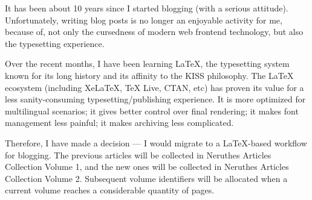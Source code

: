 
It has been about 10 years since I started blogging (with a serious attitude).
Unfortunately, writing blog posts is no longer an enjoyable activity for me,
because of, not only the cursedness of modern web frontend technology,
but also the typesetting experience.

Over the recent months, I have been learning \LaTeX{},
the typesetting system known for its long history and its affinity to the KISS philosophy.
The \LaTeX{} ecosystem (including XeLaTeX, \TeX{} Live, CTAN, etc)
has proven its value for a less sanity-consuming typesetting/publishing experience.
It is more optimized for multilingual scenarios; it gives better control over final rendering;
it makes font management less painful; it makes archiving less complicated.

Therefore, I have made a decision ---
I would migrate to a \LaTeX{}-based workflow for blogging.
The previous articles will be collected in Neruthes Articles Collection Volume 1,
and the new ones will be collected in Neruthes Articles Collection Volume 2.
Subsequent volume identifiers will be allocated when a current volume reaches a considerable quantity of pages.
